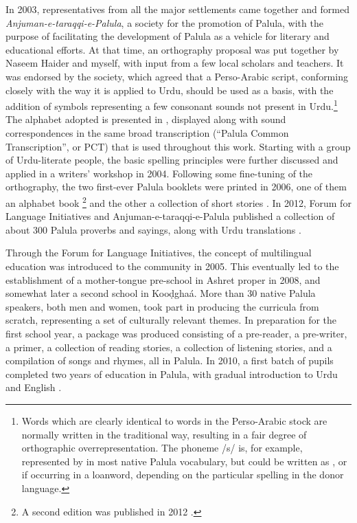 In 2003, representatives from all the major settlements came together and formed \textit{Anjuman-e-taraqqi-e-Palula}, a society for the promotion of Palula, with the purpose of facilitating the development of Palula as a vehicle for literary and educational efforts. At that time, an orthography proposal was put together by Naseem Haider and myself, with input from a few local scholars and teachers. It was endorsed by the society, which agreed that a Perso-Arabic script, conforming closely with the way it is applied to Urdu, should be used as a basis, with the addition of symbols representing a few consonant sounds not present in Urdu.\footnote{Words which are clearly identical to words in the Perso-Arabic stock are normally written in the traditional way, resulting in a fair degree of orthographic overrepresentation. The phoneme /s/ is, for example, represented by {\large{}} in most native Palula vocabulary, but could be written as {\large{}}, {\large{}} or {\large{}} if occurring in a loanword, depending on the particular spelling in the donor language.} The alphabet adopted is presented in , displayed along with sound correspondences in the same broad transcription (``Palula Common Transcription'', or PCT) that is used throughout this work. Starting with a group of Urdu-literate people, the basic spelling principles were further discussed and applied in a writers’ workshop in 2004. Following some fine-tuning of the orthography, the two first-ever Palula booklets were printed in 2006, one of them an alphabet book \citep{haider2006a}\footnote{A second edition was published in 2012 \citep{haider2012a}.} and the other a collection of short stories \citep{haider2006b}. In 2012, Forum for Language Initiatives and Anjuman-e-taraqqi-e-Palula published a collection of about 300 Palula proverbs and sayings, along with Urdu translations \citep{haider2012b}.


Through the Forum for Language Initiatives, the concept of multilingual education was introduced to the community in 2005. This eventually led to the establishment of a mother-tongue pre-school in Ashret proper in 2008, and somewhat later a second school in Kooḍghaá. More than 30 native Palula speakers, both men and women, took part in producing the curricula from scratch, representing a set of culturally relevant themes. In preparation for the first school year, a package was produced consisting of a pre-reader, a pre-writer, a primer, a collection of reading stories, a collection of listening stories, and a compilation of songs and rhymes, all in Palula. In 2010, a first batch of pupils completed two years of education in Palula, with gradual introduction to Urdu and English \citep{rehmansagar2015}. 


